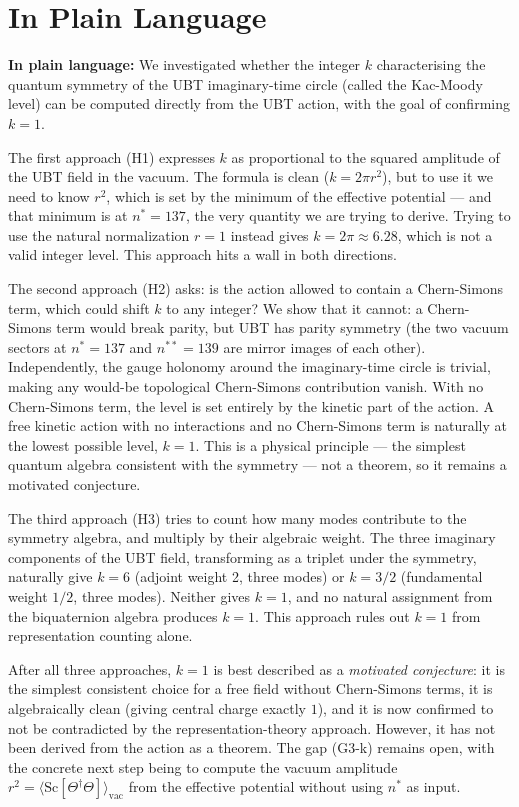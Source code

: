 \documentclass[11pt,a4paper]{article}
\theoremstyle{definition}
\theoremstyle{remark}
\begin{document}
\section{In Plain Language}
\label{sec:plain}

\textbf{In plain language:}
We investigated whether the integer $k$ characterising the quantum symmetry
of the UBT imaginary-time circle (called the Kac-Moody level) can be
computed directly from the UBT action, with the goal of confirming $k = 1$.

The first approach (H1) expresses $k$ as proportional to the squared amplitude
of the UBT field in the vacuum.
The formula is clean ($k = 2\pi r^2$), but to use it we need to know $r^2$,
which is set by the minimum of the effective potential — and that minimum is
at $n^* = 137$, the very quantity we are trying to derive.
Trying to use the natural normalization $r = 1$ instead gives $k = 2\pi \approx 6.28$,
which is not a valid integer level.
This approach hits a wall in both directions.

The second approach (H2) asks: is the action allowed to contain a
Chern-Simons term, which could shift $k$ to any integer?
We show that it cannot: a Chern-Simons term would break parity, but UBT
has parity symmetry (the two vacuum sectors at $n^* = 137$ and $n^{**} = 139$
are mirror images of each other).
Independently, the gauge holonomy around the imaginary-time circle is trivial,
making any would-be topological Chern-Simons contribution vanish.
With no Chern-Simons term, the level is set entirely by the kinetic part of
the action.
A free kinetic action with no interactions and no Chern-Simons term is
naturally at the lowest possible level, $k = 1$.
This is a physical principle — the simplest quantum algebra consistent with
the symmetry — not a theorem, so it remains a motivated conjecture.

The third approach (H3) tries to count how many modes contribute to the
symmetry algebra, and multiply by their algebraic weight.
The three imaginary components of the UBT field, transforming as a triplet
under the symmetry, naturally give $k = 6$ (adjoint weight 2, three modes) or
$k = 3/2$ (fundamental weight $1/2$, three modes).
Neither gives $k = 1$, and no natural assignment from the biquaternion algebra
produces $k = 1$.
This approach rules out $k = 1$ from representation counting alone.

After all three approaches, $k = 1$ is best described as a
\emph{motivated conjecture}: it is the simplest consistent choice for a free
field without Chern-Simons terms, it is algebraically clean (giving central
charge exactly $1$), and it is now confirmed to not be contradicted by the
representation-theory approach.
However, it has not been derived from the action as a theorem.
The gap (G3-k) remains open, with the concrete next step being to compute the
vacuum amplitude $r^2 = \langle\mathrm{Sc}[\Theta^\dagger\Theta]\rangle_\mathrm{vac}$
from the effective potential without using $n^*$ as input.

\ifdefined\INCLUDEMODE\else
\end{document}
